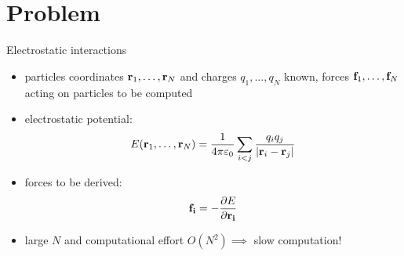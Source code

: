 \documentclass[11pt]{beamer}
\begin{document}
\section{Problem}
\begin{frame}{Electrostatic interactions}
\begin{itemize}
\item particles coordinates $\bold{r}_1, \dotsc, \bold{r}_N$ and charges $q_1, \dotsc, q_N$ known, forces $\bold{f}_1, \dotsc, \bold{f}_N$ acting on particles to be computed 
\item electrostatic potential:
\[E(\bold{r}_1, \dotsc, \bold{r}_N) = \frac{1}{4 \pi \varepsilon_0}\sum\limits_{i < j}\frac{q_i q_j}{\lvert \bold{r}_i-\bold{r}_j\rvert}\]
\item forces to be derived:
\[\bold{f_i} = -\frac{\partial E}{\partial \bold{r_i}} \]
\item large $N$ and computational effort $O(N^2) \implies$ slow computation!
\end{itemize}
\end{frame}
\end{document}
